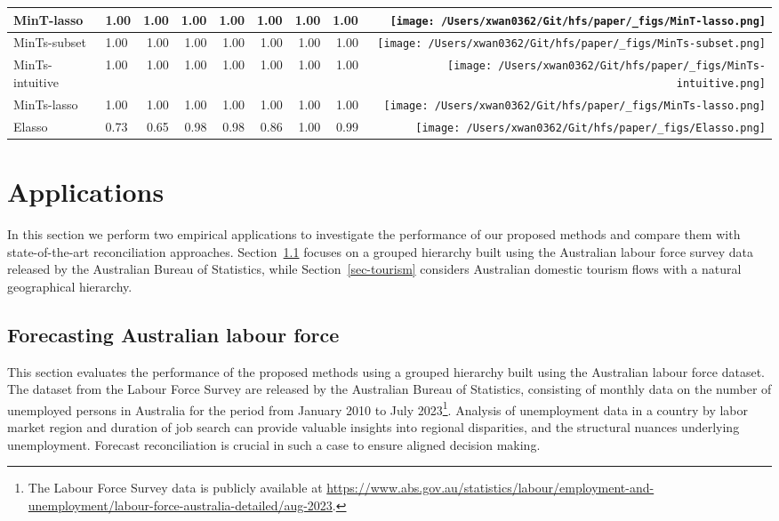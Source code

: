 \documentclass[11pt,a4paper,]{article}
\begin{document}
\begin{table}[!h]
{\begin{tabular}{llrrrrrr>{}r}
MinT-lasso & 1.00 & 1.00 & 1.00 & 1.00 & 1.00 & 1.00 & 1.00 & \texttt{[image: /Users/xwan0362/Git/hfs/paper/\_figs/MinT-lasso.png]}\\
\midrule
MinTs-subset & 1.00 & 1.00 & 1.00 & 1.00 & 1.00 & 1.00 & 1.00 & \texttt{[image: /Users/xwan0362/Git/hfs/paper/\_figs/MinTs-subset.png]}\\
MinTs-intuitive & 1.00 & 1.00 & 1.00 & 1.00 & 1.00 & 1.00 & 1.00 & \texttt{[image: /Users/xwan0362/Git/hfs/paper/\_figs/MinTs-intuitive.png]}\\
MinTs-lasso & 1.00 & 1.00 & 1.00 & 1.00 & 1.00 & 1.00 & 1.00 & \texttt{[image: /Users/xwan0362/Git/hfs/paper/\_figs/MinTs-lasso.png]}\\
\midrule
Elasso & 0.73 & 0.65 & 0.98 & 0.98 & 0.86 & 1.00 & 0.99 & \texttt{[image: /Users/xwan0362/Git/hfs/paper/\_figs/Elasso.png]}\\
\bottomrule
\end{tabular}}
\end{table}

\hypertarget{sec-applications}{%
\section{Applications}\label{sec-applications}}

In this section we perform two empirical applications to investigate the
performance of our proposed methods and compare them with
state-of-the-art reconciliation approaches. Section~\ref{sec-labour}
focuses on a grouped hierarchy built using the Australian labour force
survey data released by the Australian Bureau of Statistics, while
Section~\ref{sec-tourism} considers Australian domestic tourism flows
with a natural geographical hierarchy.

\hypertarget{sec-labour}{%
\subsection{Forecasting Australian labour force}\label{sec-labour}}

This section evaluates the performance of the proposed methods using a
grouped hierarchy built using the Australian labour force dataset. The
dataset from the Labour Force Survey are released by the Australian
Bureau of Statistics, consisting of monthly data on the number of
unemployed persons in Australia for the period from January 2010 to July
2023\footnote{The Labour Force Survey data is publicly available at
  \url{https://www.abs.gov.au/statistics/labour/employment-and-unemployment/labour-force-australia-detailed/aug-2023}.}.
Analysis of unemployment data in a country by labor market region and
duration of job search can provide valuable insights into regional
disparities, and the structural nuances underlying unemployment.
Forecast reconciliation is crucial in such a case to ensure aligned
decision making.
\end{document}
